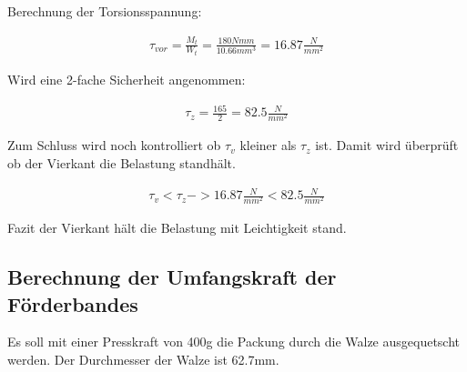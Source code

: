 Berechnung der Torsionsspannung:

\begin{align*}
\tau_{ vor } = \frac{ M_{ t } }{W_{ t } } = \frac{ 180 Nmm }{ 10.66 mm^{3} } = 16.87\frac{ N }{mm^{2}}
\end{align*}

Wird eine 2-fache Sicherheit angenommen:

\begin{align*}
\tau_z=\frac{165}{2}=82.5\frac{N}{mm^{2}}
\end{align*}

Zum Schluss wird noch kontrolliert ob $\tau_v$ kleiner als $\tau_z$ ist.
Damit wird überprüft ob der Vierkant die Belastung standhält.

\begin{align*}
\tau_v < \tau_z  ->  16.87 \frac{N}{mm^{2}} < 82.5\frac{N}{mm^{2}}
\end{align*}

Fazit der Vierkant hält die Belastung mit Leichtigkeit stand.

\subsection{Berechnung der Umfangskraft der Förderbandes}

Es soll mit einer Presskraft von 400g die Packung durch die Walze ausgequetscht werden. Der Durchmesser der Walze ist 62.7mm.


